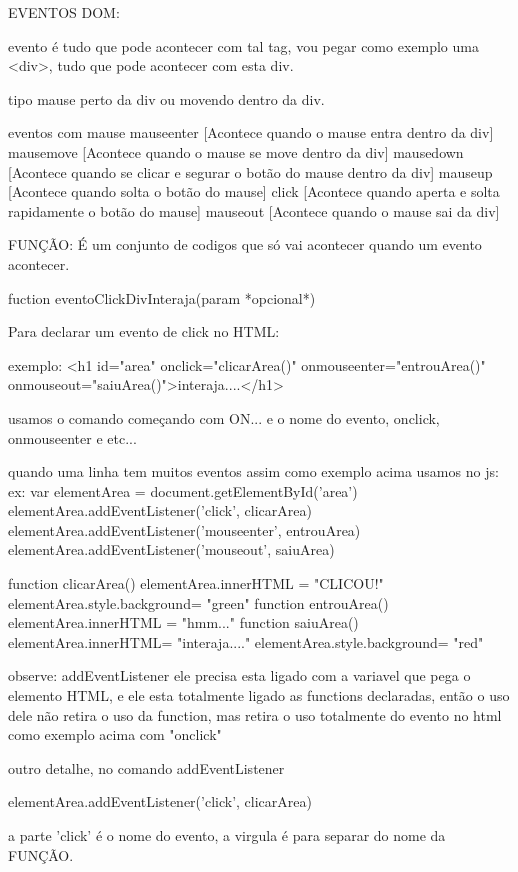 EVENTOS DOM: 

evento é tudo que pode acontecer com tal tag, vou pegar como exemplo uma <div>, tudo que pode acontecer com esta div.

tipo mause perto da div ou movendo dentro da div.

eventos com mause {
    mauseenter [Acontece quando o mause entra dentro da div]
    mausemove [Acontece quando o mause se move dentro da div]
    mausedown [Acontece quando se clicar e segurar o botão do mause dentro da div]
    mauseup [Acontece quando solta o botão do mause]
    click [Acontece quando aperta e solta rapidamente o botão do mause]
    mauseout [Acontece quando o mause sai da div]
}

FUNÇÃO:
É um conjunto de codigos que só vai acontecer quando um evento acontecer. 

fuction eventoClickDivInteraja(param *opcional*){

}

Para declarar um evento de click no HTML:

exemplo: 
<h1 id="area" onclick="clicarArea()" onmouseenter="entrouArea()" onmouseout="saiuArea()">interaja....</h1>

usamos o comando começando com ON... e o nome do evento, onclick, onmouseenter e etc...

quando uma linha tem muitos eventos assim como exemplo acima usamos no js:
ex: 
var elementArea = document.getElementById('area')
elementArea.addEventListener('click', clicarArea)
 elementArea.addEventListener('mouseenter', entrouArea)
 elementArea.addEventListener('mouseout', saiuArea)

function clicarArea(){
elementArea.innerHTML = "CLICOU!"
elementArea.style.background= "green"
}
function entrouArea() {
elementArea.innerHTML = "hmm..."
}
function saiuArea(){
elementArea.innerHTML= "interaja...."
elementArea.style.background= "red"
}

observe: addEventListener ele precisa esta ligado com a variavel que pega o elemento HTML, 
e ele esta totalmente ligado as functions declaradas, então o uso dele não retira o uso da function,
mas retira o uso totalmente do evento no html como exemplo acima com "onclick"

outro detalhe, no comando addEventListener{
    elementArea.addEventListener('click', clicarArea)
    
    a parte 'click' é o nome do evento, a virgula é para separar do nome da FUNÇÃO.
}
